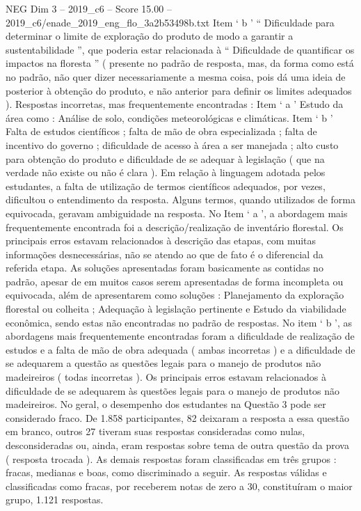\begin{textsample}{NEG Dim 3 – 2019\_c6 – Score 15.00 – 2019\_c6/enade\_2019\_eng\_flo\_3a2b53498b.txt}
Item ‘ b ’ “ Dificuldade para determinar o limite de exploração do produto de modo a garantir a sustentabilidade ”, que poderia estar relacionada à “ Dificuldade de quantificar os impactos na floresta ” ( presente no padrão de resposta, mas, da forma como está no padrão, não quer dizer necessariamente a mesma coisa, pois dá uma ideia de posterior à obtenção do produto, e não anterior para definir os limites adequados ).
Respostas incorretas, mas frequentemente encontradas : Item ‘ a ’ Estudo da área como : Análise de solo, condições meteorológicas e climáticas.
Item ‘ b ’ Falta de estudos científicos ; falta de mão de obra especializada ; falta de incentivo do governo ; dificuldade de acesso à área a ser manejada ; alto custo para obtenção do produto e dificuldade de se adequar à legislação ( que na verdade não existe ou não é clara ).
Em relação à linguagem adotada pelos estudantes, a falta de utilização de termos científicos adequados, por vezes, dificultou o entendimento da resposta.
Alguns termos, quando utilizados de forma equivocada, geravam ambiguidade na resposta.
No Item ‘ a ’, a abordagem mais frequentemente encontrada foi a descrição/realização de inventário florestal.
Os principais erros estavam relacionados à descrição das etapas, com muitas informações desnecessárias, não se atendo ao que de fato é o diferencial da referida etapa.
As soluções apresentadas foram basicamente as contidas no padrão, apesar de em muitos casos serem apresentadas de forma incompleta ou equivocada, além de apresentarem como soluções : Planejamento da exploração florestal ou colheita ; Adequação à legislação pertinente e Estudo da viabilidade econômica, sendo estas não encontradas no padrão de respostas.
No item ‘ b ’, as abordagens mais frequentemente encontradas foram a dificuldade de realização de estudos e a falta de mão de obra adequada ( ambas incorretas ) e a dificuldade de se adequarem a questão as questões legais para o manejo de produtos não madeireiros ( todas incorretas ).
Os principais erros estavam relacionados à dificuldade de se adequarem às questões legais para o manejo de produtos não madeireiros.
No geral, o desempenho dos estudantes na Questão 3 pode ser considerado fraco.
De 1.858 participantes, 82 deixaram a resposta a essa questão em branco, outros 27 tiveram suas respostas consideradas como nulas, desconsideradas ou, ainda, eram respostas sobre tema de outra questão da prova ( resposta trocada ).
As demais respostas foram classificadas em três grupos : fracas, medianas e boas, como discriminado a seguir.
As respostas válidas e classificadas como fracas, por receberem notas de zero a 30, constituíram o maior grupo, 1.121 respostas.

\end{textsample}
